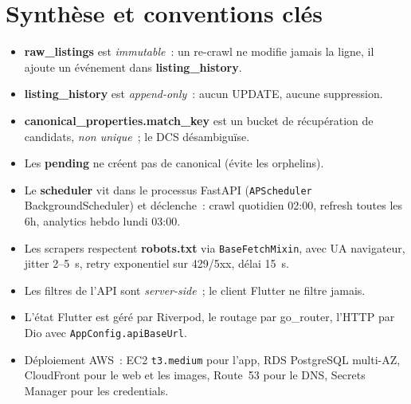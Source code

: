 \documentclass[11pt,a4paper]{report}
\begin{document}
\chapter{Synth\`ese et conventions cl\'es}

\begin{itemize}[leftmargin=*, itemsep=2pt]
  \item \textbf{raw\_listings} est \emph{immutable}~: un re-crawl ne modifie
  jamais la ligne, il ajoute un \'ev\'enement dans \textbf{listing\_history}.
  \item \textbf{listing\_history} est \emph{append-only}~: aucun UPDATE,
  aucune suppression.
  \item \textbf{canonical\_properties.match\_key} est un bucket de
  r\'ecup\'eration de candidats, \emph{non unique}~; le DCS d\'esambigu\"ise.
  \item Les \textbf{pending} ne cr\'eent pas de canonical (\'evite les
  orphelins).
  \item Le \textbf{scheduler} vit dans le processus FastAPI
  (\texttt{APScheduler} BackgroundScheduler) et d\'eclenche~: crawl
  quotidien 02:00, refresh toutes les 6h, analytics hebdo lundi 03:00.
  \item Les scrapers respectent \textbf{robots.txt} via
  \texttt{BaseFetchMixin}, avec UA navigateur, jitter 2--5~s, retry
  exponentiel sur 429/5xx, d\'elai 15~s.
  \item Les filtres de l'API sont \emph{server-side}~; le client Flutter ne
  filtre jamais.
  \item L'\'etat Flutter est g\'er\'e par Riverpod, le routage par
  go\_router, l'HTTP par Dio avec \texttt{AppConfig.apiBaseUrl}.
  \item D\'eploiement AWS~: EC2 \texttt{t3.medium} pour l'app, RDS
  PostgreSQL multi-AZ, CloudFront pour le web et les images, Route~53 pour
  le DNS, Secrets Manager pour les credentials.
\end{itemize}
\end{document}
